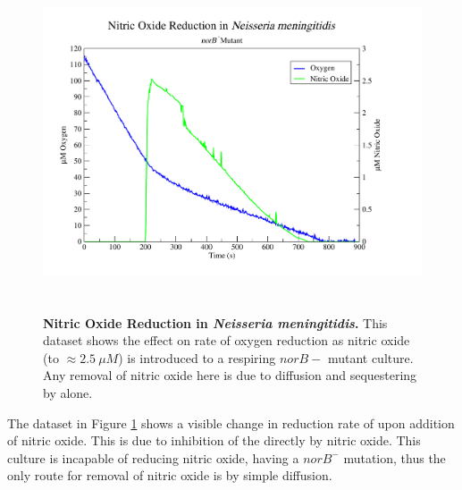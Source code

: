 \begin{figure}[tbp]
 \centering
 \includegraphics[height=10cm, trim=1cm 1cm 3cm 1cm, clip=true]{./06-noreduction/data/aer-no-data3.pdf}
 \caption[{Nitric Oxide Reduction in \textit{Neisseria meningitidis}.}]{{\bf Nitric Oxide Reduction in \textit{Neisseria meningitidis}.} This dataset shows the effect on rate of oxygen reduction as nitric oxide (to $\approx 2.5~\mu M$) is introduced to a respiring $norB-$ mutant culture. Any removal of nitric oxide here is due to diffusion and sequestering by \cbbthree{} alone.}
 \label{fig:nodata3}
\end{figure}
The dataset in Figure \ref{fig:nodata3} shows a visible change in reduction rate of \cbbthree{} upon addition of nitric oxide. This is due to inhibition of the \cbbthree{} directly by nitric oxide. This culture is incapable of reducing nitric oxide, having a $norB^-$ mutation, thus the only route for removal of nitric oxide is by simple diffusion.

